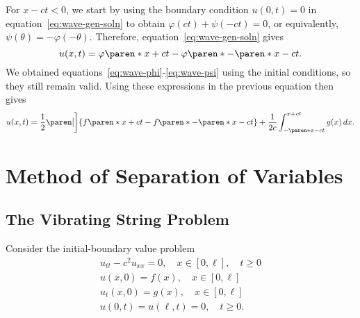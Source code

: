 \documentclass[11pt]{penrose}
\newcommand{\utt}{u_{tt}}
\newcommand{\uxx}{u_{xx}}
\begin{document}
For $x - ct < 0$, we start by using the boundary condition $u(0, t) = 0$ in equation~\eqref{eq:wave-gen-soln} to obtain $\varphi(ct) + \psi(-ct) = 0$, or equivalently, $\psi(\theta) = - \varphi(-\theta)$. Therefore, equation~\eqref{eq:wave-gen-soln} gives
\begin{equation}
    u(x, t) = \varphi\paren*{x + ct} - \varphi\paren*{-\paren*{x - ct}}.
\end{equation}
We obtained equations~\eqref{eq:wave-phi}-\eqref{eq:wave-psi} using the initial conditions, so they still remain valid. Using these expressions in the previous equation then gives
\begin{equation}
    u(x, t)
    = \frac{1}{2} \paren[\bigg]{f\paren*{x + ct} - f\paren*{-\paren*{x - ct}}}
    + \frac{1}{2c} \int_{-\paren*{x - ct}}^{x + ct} g(x) \,dx.
    \label{eq:wave-soln-semiinfinite}
\end{equation}





\section{Method of Separation of Variables}
\subsection{The Vibrating String Problem}
Consider the initial-boundary value problem
\begin{gather}
    \utt - c^2 \uxx = 0, \quad x \in [0, \ell], \quad t \geq 0\\
    u(x,0) = f(x), \quad x \in [0, \ell]\\
    u_t(x,0) = g(x), \quad x \in [0, \ell]\\
    u(0,t) = u(\ell,t) = 0, \quad t \geq 0.
\end{gather}
\end{document}
